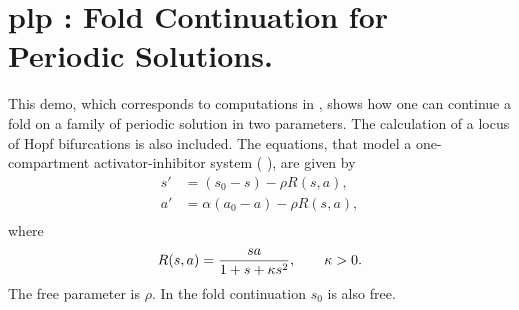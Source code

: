 \documentclass[12pt]{report}
\begin{document}
\section{ plp : Fold Continuation for Periodic Solutions.} \label{sec:Demos_plp}
This demo, which corresponds to computations in 
 \citeyear{DoKeKe:91a}, shows how one can
continue a fold on a family of periodic solution in two parameters.
The calculation of a locus of Hopf bifurcations is also included.
The equations, that model a one-compartment activator-inhibitor system 
( \citeyear{JPK:80}),
are given by
\begin{equation} \begin{array}{cl}
 s' &= (s_{0} - s) - \rho R (s,a), \\
 a' &=\alpha (a_{0} - a) - \rho R (s,a), \\
\end{array} \end{equation}
where
$$ R(s,a)={s a \over 1+s+ \kappa s^{2} },
\qquad \kappa  > 0. $$
The free parameter is $\rho$.
In the fold continuation $s_0$ is also free.
\end{document}
